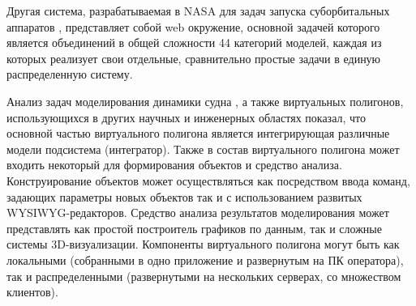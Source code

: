 Другая система, разрабатываемая в NASA для задач запуска суборбитальных аппаратов  \citep{vtb_ILRO},
представляет собой web окружение, основной задачей которого является объединений в общей сложности 44 категорий моделей, каждая из которых реализует свои отдельные, сравнительно простые задачи в единую распределенную систему.




Анализ задач моделирования динамики судна \citep{nechaev_ai}, а также виртуальных полигонов, использующихся в других научных и инженерных областях показал, что основной частью виртуального полигона является интегрирующая различные модели подсистема (интегратор). Также в состав виртуального полигона может входить некоторый 
 для формирования объектов и средство анализа. Конструирование объектов может осуществляться как посредством ввода команд, задающих параметры новых объектов так и с использованием развитых WYSIWYG-редакторов. Средство анализа результатов моделирования может представлять как простой построитель графиков по данным, так и сложные системы 3D-визуализации. Компоненты виртуального полигона могут быть как локальными (собранными в одно приложение и развернутым на ПК оператора), так и распределенными (развернутыми на нескольких серверах, со множеством клиентов).

